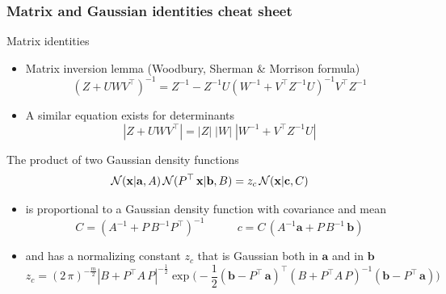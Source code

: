 \begin{frame}
\frametitle{Matrix and Gaussian identities cheat sheet}

Matrix identities
\begin{itemize}
\item Matrix inversion lemma (Woodbury, Sherman \& Morrison formula)
%
\[
(Z+UWV^\top)^{-1}=Z^{-1}-Z^{-1}U(W^{-1}+V^\top Z^{-1}U)^{-1}V^\top Z^{-1}
\]
%
\item A similar equation exists for determinants
\[
|Z+UWV^\top|=|Z|\;|W|\;|W^{-1}+V^\top Z^{-1}U|
\]
\end{itemize}

The product of two Gaussian density functions
%
\[
\mathcal{N}(\mathbf x|{\mathbf a},A)\,\mathcal{N}(P^\top\,\mathbf x|{\mathbf b},B) = z_c\,
\mathcal{N}(\mathbf x|{\mathbf c},C)
\]
%
\vspace{-5mm}
\begin{itemize}
\item is proportional to a Gaussian density function with covariance and mean
%
\[
C = \left(A^{-1}+P\,B^{-1}P^\top\right)^{-1}\enspace \hspace{1cm} c =
C\,\left(A^{-1}{\mathbf a}+P\,B^{-1}\,{\mathbf b}\right)
\]
%
\item and has a normalizing constant $z_c$ that is Gaussian both in ${\mathbf
a}$ and in ${\mathbf b}$ 
%
\[
z_c = (2\,\pi)^{-\frac{m}{2}}|B+P^\top A\,P|^{-\frac{1}{2}}
\exp\big(-\frac{1}{2}({\mathbf b}-P^\top\,{\mathbf a})^\top
\left(B+P^\top A\,P\right)^{-1}({\mathbf b}-P^\top\,{\mathbf a})
\big)
\]
%
\end{itemize}
\end{frame}



